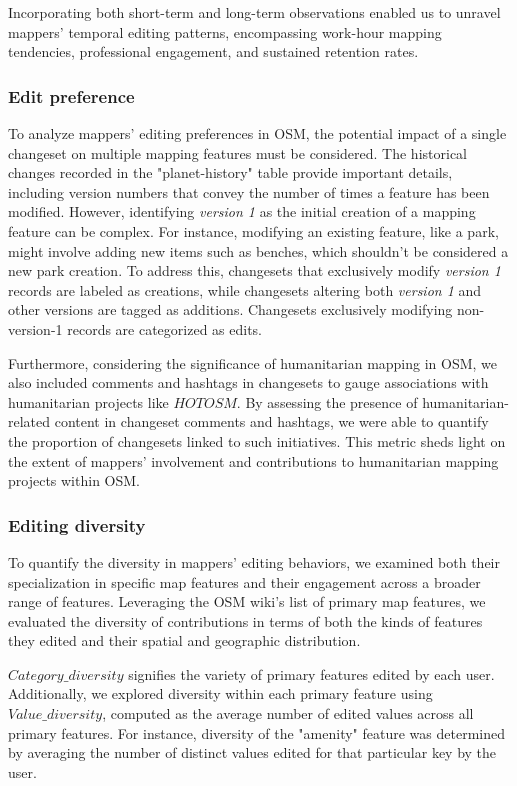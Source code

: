 \documentclass[manuscript,screen,review]{acmart}
\begin{document}
Incorporating both short-term and long-term observations enabled us to unravel mappers' temporal editing patterns, encompassing work-hour mapping tendencies, professional engagement, and sustained retention rates.

\subsubsection{Edit preference}

To analyze mappers' editing preferences in OSM, the potential impact of a single changeset on multiple mapping features must be considered. The historical changes recorded in the "planet-history" table provide important details, including version numbers that convey the number of times a feature has been modified. However, identifying \textit{version 1} as the initial creation of a mapping feature can be complex. For instance, modifying an existing feature, like a park, might involve adding new items such as benches, which shouldn't be considered a new park creation. To address this, changesets that exclusively modify \textit{version 1} records are labeled as creations, while changesets altering both \textit{version 1} and other versions are tagged as additions. Changesets exclusively modifying non-version-1 records are categorized as edits.  

Furthermore, considering the significance of humanitarian mapping in OSM, we also included comments and hashtags in changesets to gauge associations with humanitarian projects like $HOTOSM$\cite{Hotosm}. By assessing the presence of humanitarian-related content in changeset comments and hashtags, we were able to quantify the proportion of changesets linked to such initiatives. This metric sheds light on the extent of mappers' involvement and contributions to humanitarian mapping projects within OSM.

\subsubsection{Editing diversity}

To quantify the diversity in mappers' editing behaviors, we examined both their specialization in specific map features and their engagement across a broader range of features. Leveraging the OSM wiki's list of primary map features, we evaluated the diversity of contributions in terms of both the kinds of features they edited and their spatial and geographic distribution.

$Category\_diversity$ signifies the variety of primary features edited by each user. Additionally, we explored diversity within each primary feature using $Value\_diversity$, computed as the average number of edited values across all primary features. For instance, diversity of the "amenity" feature was determined by averaging the number of distinct values edited for that particular key by the user.
\end{document}
